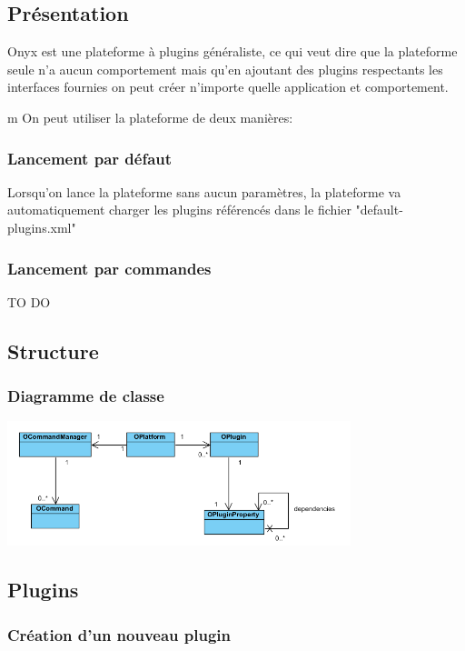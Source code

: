\subsection{Présentation}

Onyx est une plateforme à plugins généraliste, ce qui veut dire que la plateforme seule n'a aucun comportement mais qu'en ajoutant des plugins respectants les interfaces fournies on peut créer n'importe quelle application et comportement.

m
On peut utiliser la plateforme de deux manières:


\subsubsection{Lancement par défaut}

Lorsqu'on lance la plateforme sans aucun paramètres, la plateforme va automatiquement charger les plugins référencés dans le fichier "default-plugins.xml"

\subsubsection{Lancement par commandes}

TO DO

\subsection{Structure}

\subsubsection{Diagramme de classe}
\includegraphics[width=10cm]{figures/class_diagram.png}

\subsection{Plugins}

\subsubsection{Création d'un nouveau plugin}

